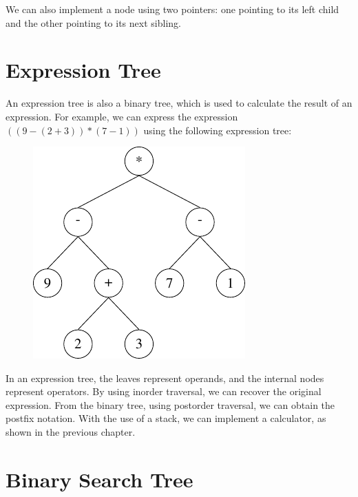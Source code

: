 We can also implement a node using two pointers: one pointing to its left child and the other pointing to its next sibling.

\section{Expression Tree}
An expression tree is also a binary tree, which is used to calculate the result of an expression. For example, we can express the expression \(((9 - (2 + 3)) * (7 - 1))\) using the following expression tree:

\begin{figure}[H]
  \centering
  \includegraphics[height=0.3\textwidth]{Figure/Expression-Tree.pdf}
\end{figure}

In an expression tree, the leaves represent operands, and the internal nodes represent operators. By using inorder traversal, we can recover the original expression. From the binary tree, using postorder traversal, we can obtain the postfix notation. With the use of a stack, we can implement a calculator, as shown in the previous chapter.

\section{Binary Search Tree}
